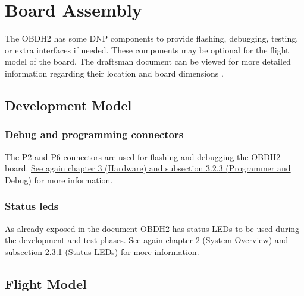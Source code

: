 %
%
%
%
%

%
%
%
%
%
%

\chapter{Board Assembly} \label{ch:assembly}

The OBDH2 has some DNP components to provide flashing, debugging, testing, or extra interfaces if needed. These components may be optional for the flight model of the board. The draftsman document can be viewed for more detailed information regarding their location and board dimensions \cite{obdh2-draftsman}.

\section{Development Model}

\subsection{Debug and programming connectors}

The P2 and P6 connectors are used for flashing and debugging the OBDH2 board. \hyperref[sec:programer-and-debug]{See again chapter 3 (Hardware) and subsection 3.2.3 (Programmer and Debug) for more information}.

\subsection{Status leds}

As already exposed in the document OBDH2 has status LEDs to be used during the development and test phases. \hyperref[sec:status-leds]{See again chapter 2 (System Overview) and subsection 2.3.1 (Status LEDs) for more information}.

\section{Flight Model}

